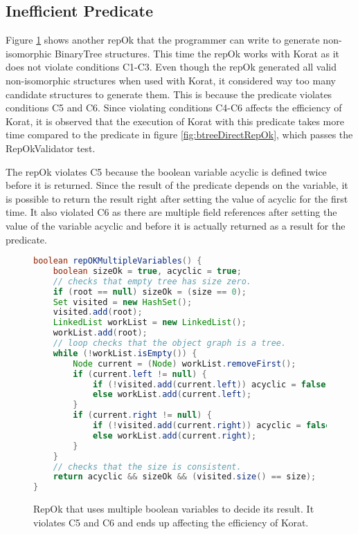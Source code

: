 \subsection{Inefficient Predicate}
\label{sec:inefficient-predicate}
Figure \ref{fig:repOkMultipleBooleanVariables} shows another repOk that the programmer can write to generate non-isomorphic BinaryTree structures. This time the repOk works with Korat as it does not violate conditions C1-C3. Even though the repOk generated all valid non-isomorphic structures when used with Korat, it considered way too many candidate structures to generate them. This is because the predicate violates conditions C5 and C6. Since violating conditions C4-C6 affects the efficiency of Korat, it is observed that the execution of Korat with this predicate takes more time compared to the predicate in figure \ref{fig:btreeDirectRepOk}, which passes the RepOkValidator test.

\para
The repOk violates C5 because the boolean variable acyclic is defined twice before it is returned. Since the result of the predicate depends on the variable, it is possible to return the result right after setting the value of acyclic for the first time. It also violated C6 as there are multiple field references after setting the value of the variable acyclic and before it is actually returned as a result for the predicate.

\begin{figure}
\centering
\begin{lstlisting}[language=Java]
boolean repOKMultipleVariables() {
    boolean sizeOk = true, acyclic = true;
    // checks that empty tree has size zero.
    if (root == null) sizeOk = (size == 0);
    Set visited = new HashSet();
    visited.add(root);
    LinkedList workList = new LinkedList();
    workList.add(root);
    // loop checks that the object graph is a tree.
    while (!workList.isEmpty()) {
        Node current = (Node) workList.removeFirst();
        if (current.left != null) {
            if (!visited.add(current.left)) acyclic = false;
            else workList.add(current.left);
        }
        if (current.right != null) {
            if (!visited.add(current.right)) acyclic = false;
            else workList.add(current.right);
        }
    }
    // checks that the size is consistent.
    return acyclic && sizeOk && (visited.size() == size);  
}
\end{lstlisting}
\caption{RepOk that uses multiple boolean variables to decide its result. It violates C5 and C6 and ends up affecting the efficiency of Korat.}
\label{fig:repOkMultipleBooleanVariables}
\end{figure}


